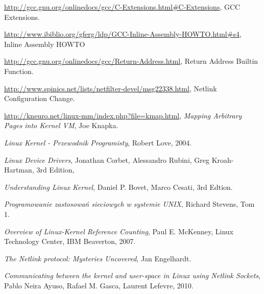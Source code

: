 \documentclass[10pt]{scrartcl}
\begin{document}
\begin{thebibliography}{99}

    \url{http://gcc.gnu.org/onlinedocs/gcc/C-Extensions.html#C-Extensions},
    GCC Extensions.

    \url{http://www.ibiblio.org/gferg/ldp/GCC-Inline-Assembly-HOWTO.html#s4},
    Inline Assembly HOWTO

    \url{http://gcc.gnu.org/onlinedocs/gcc/Return-Address.html},
    Return Address Builtin Function.

    \url{http://www.spinics.net/lists/netfilter-devel/msg22338.html},
    Netlink Configuration Change.

    \url{http://kneuro.net/linux-mm/index.php?file=kmap.html},
    \textit{Mapping Arbitrary Pages into Kernel VM},
    Joe Knapka.

    \textit{Linux Kernel - Przewodnik Programisty},
    Robert Love,
    2004.

    \textit{Linux Device Drivers},
    Jonathan Corbet, Alessandro Rubini, Greg Kroah-Hartman,
    3rd Edition,

    \textit{Understanding Linux Kernel},
    Daniel P. Bovet, Marco Cesati,
    3rd Edtion.

    \textit{Programowanie zastosowań sieciowych w systemie UNIX},
    Richard Stevens,
    Tom 1.

    \textit{Overview of Linux-Kernel Reference Counting},
    Paul E. McKenney,
    Linux Technology Center,
    IBM Beaverton,
    2007.

    \textit{The Netlink protocol: Mysteries Uncovered},
    Jan Engelhardt.

    \textit{Communicating between the kernel and user-space in Linux using Netlink Sockets},
    Pablo Neira Ayuso, Rafael M. Gasca, Laurent Lefevre,
    2010.

\end{thebibliography}

\listoffigures
\end{document}
